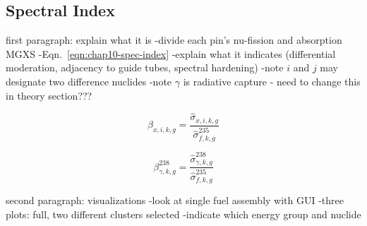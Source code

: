 \clearpage


\subsection{Spectral Index}
\label{subsec:chap10-spec-index}

first paragraph: explain what it is
-divide each pin's nu-fission and absorption \ac{MGXS} 
-Eqn.~\ref{eqn:chap10-spec-index}
-explain what it indicates (differential moderation, adjacency to guide tubes, spectral hardening)
-note $i$ and $j$ may designate two difference nuclides
-note $\gamma$ is radiative capture - need to change this in theory section???

\begin{equation}
\label{eqn:chap10-spec-index-general}
\beta_{x,i,k,g} = \frac{\hat{\sigma}_{x,i,k,g}}{\hat{\sigma}_{f,k,g}^{235}}
\end{equation}

\begin{equation}
\label{eqn:chap10-spec-index-u238-capt}
\beta_{\gamma,k,g}^{238} = \frac{\hat{\sigma}_{\gamma,k,g}^{238}}{\hat{\sigma}_{f,k,g}^{235}}
\end{equation}

second paragraph: visualizations
-look at single fuel assembly with GUI
-three plots: full, two different clusters selected
-indicate which energy group and nuclide

